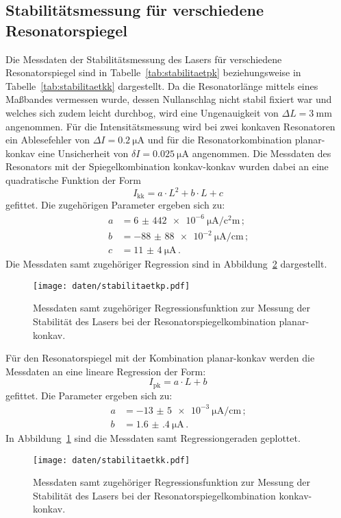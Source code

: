\subsection{Stabilitätsmessung für verschiedene Resonatorspiegel}
Die Messdaten der Stabilitätsmessung des Lasers für verschiedene Resonatorspiegel sind in Tabelle~\ref{tab:stabilitaetpk} beziehungsweise in Tabelle~\ref{tab:stabilitaetkk} dargestellt.
Da die Resonatorlänge mittels eines Maßbandes vermessen wurde, dessen Nullanschlag nicht stabil fixiert war und welches sich zudem leicht durchbog, wird eine Ungenauigkeit von $\Delta L=\SI{3}{\milli\meter}$ angenommen.
Für die Intensitätsmessung wird bei zwei konkaven Resonatoren ein Ablesefehler von $\Delta I=\SI{0.2}{\micro\ampere}$ und für die Resonatorkombination planar-konkav eine Unsicherheit von $\delta I=\SI{0.025}{\micro\ampere}$ angenommen.
Die Messdaten des Resonators mit der Spiegelkombination konkav-konkav wurden dabei an eine quadratische Funktion der Form
\begin{equation}
  I_{\text{kk}}=a\cdot L^2+b\cdot L+c
\end{equation}
gefittet.
Die zugehörigen Parameter ergeben sich zu:
\begin{align}
  a&=\SI{6(442)e-6}{\micro\ampere\per\square\centi\meter}\,\text{;}\\
  b&=-\SI{88(88)e-2}{\micro\ampere\per\centi\meter} \,\text{;}\\
  c&=\SI{11(4)}{\micro\ampere}\,\text{.}
\end{align}
Die Messdaten samt zugehöriger Regression sind in Abbildung~\ref{fig:kk} dargestellt.
\begin{figure}
  \centering
  \texttt{[image: daten/stabilitaetkp.pdf]}
  \caption{Messdaten samt zugehöriger Regressionsfunktion zur Messung der Stabilität des Lasers bei der Resonatorspiegelkombination planar-konkav.}
  \label{fig:pk}
\end{figure}

Für den Resonatorspiegel mit der Kombination planar-konkav werden die Messdaten an eine lineare Regression der Form:
\begin{equation}
  I_{\text{pk}}=a\cdot L+b
\end{equation}
gefittet.
Die Parameter ergeben sich zu:
\begin{align}
    a&=-\SI{13(5)e-3}{\micro\ampere\per\centi\meter}\,\text{;}\\
  b&=\SI{1.6(4)}{\micro\ampere}\,\text{.}
\end{align}
In Abbildung~\ref{fig:pk} sind die Messdaten samt Regressiongeraden geplottet.

\begin{figure}
  \centering
  \texttt{[image: daten/stabilitaetkk.pdf]}
  \caption{Messdaten samt zugehöriger Regressionsfunktion zur Messung der Stabilität des Lasers bei der Resonatorspiegelkombination konkav-konkav.}
  \label{fig:kk}
\end{figure}

